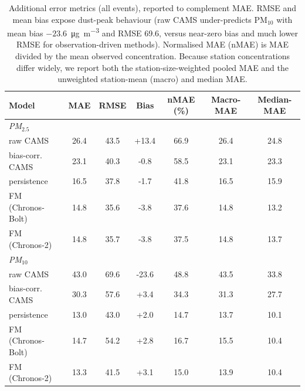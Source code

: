 \documentclass[11pt]{article}
\newcommand*{\pmten}{\ensuremath{\mathrm{PM_{10}}}}
\begin{document}
\begin{table}[htbp]\centering\footnotesize
\caption{Additional error metrics (all events), reported to complement MAE. RMSE and mean bias expose dust-peak behaviour (raw CAMS under-predicts \pmten{} with mean bias $-23.6$~\si{\micro\gram\per\cubic\metre} and RMSE 69.6, versus near-zero bias and much lower RMSE for observation-driven methods). Normalised MAE (nMAE) is MAE divided by the mean observed concentration. Because station concentrations differ widely, we report both the station-size-weighted pooled MAE and the unweighted station-mean (macro) and median MAE.}
\begin{tabular}{lcccccc}\toprule
Model & MAE & RMSE & Bias & nMAE (\%) & Macro-MAE & Median-MAE \\ \midrule
\multicolumn{7}{l}{\textit{PM$_{2.5}$}} \\
\quad raw CAMS & 26.4 & 43.5 & +13.4 & 66.9 & 26.4 & 24.8 \\
\quad bias-corr. CAMS & 23.1 & 40.3 & -0.8 & 58.5 & 23.1 & 23.3 \\
\quad persistence & 16.5 & 37.8 & -1.7 & 41.8 & 16.5 & 15.9 \\
\quad FM (Chronos-Bolt) & 14.8 & 35.6 & -3.8 & 37.6 & 14.8 & 13.2 \\
\quad FM (Chronos-2) & 14.8 & 35.7 & -3.8 & 37.5 & 14.8 & 13.7 \\
\multicolumn{7}{l}{\textit{PM$_{10}$}} \\
\quad raw CAMS & 43.0 & 69.6 & -23.6 & 48.8 & 43.5 & 33.8 \\
\quad bias-corr. CAMS & 30.3 & 57.6 & +3.4 & 34.3 & 31.3 & 27.7 \\
\quad persistence & 13.0 & 43.0 & +2.0 & 14.7 & 13.7 & 10.1 \\
\quad FM (Chronos-Bolt) & 14.7 & 54.2 & +2.8 & 16.7 & 15.5 & 10.4 \\
\quad FM (Chronos-2) & 13.3 & 41.5 & +3.1 & 15.0 & 13.9 & 10.4 \\
\bottomrule\end{tabular}\end{table}
\end{document}
